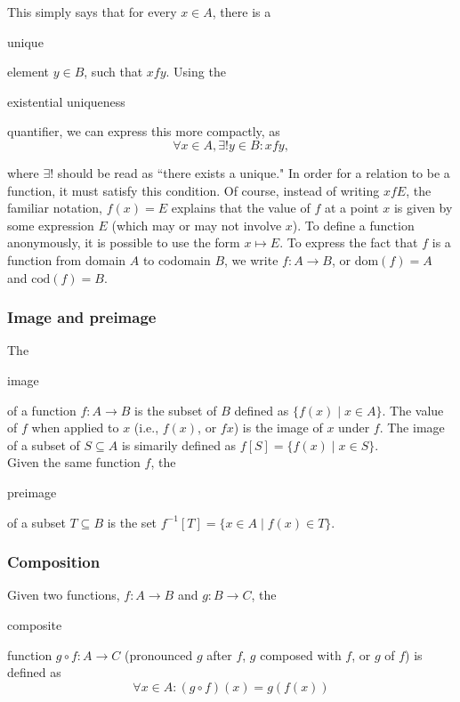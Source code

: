 \documentclass[11pt]{article}
\theoremstyle{plain}
\theoremstyle{definition}
\begin{document}
\noindent This simply says that for every $ x \in A $, there is a \begin{em}unique\end{em} element $ y \in B $, such that $ x f y $. Using the \begin{em}existential uniqueness\end{em} quantifier, we can express this more compactly, as
$$
  \forall x \in A, \exists ! y \in B : x f y,
$$

\noindent where $ \exists ! $ should be read as ``there exists a unique."
In order for a relation to be a function, it must satisfy this condition.
Of course, instead of writing $ x f E $, the familiar notation, $ f(x) = E $ explains that the value of $ f $ at a point $ x $ is given by some expression $ E $ (which may or may not involve $ x $).
To define a function anonymously, it is possible to use the form $ x \mapsto E $.
To express the fact that $ f $ is a function from domain $ A $ to codomain $ B $, we write $ f : A \to B $, or $ \mathrm{dom}(f) = A $ and $ \mathrm{cod}(f) = B $.

\subsubsection*{Image and preimage}

The \begin{em}image\end{em} of a function $ f : A \to B $ is the subset of $ B $ defined as $ \{ f(x) \mid x \in A \} $.
The value of $ f $ when applied to $ x $ (i.e., $ f (x) $, or $ f x $) is the image of $ x $ under $ f $.
The image of a subset of $ S \subseteq A $ is simarily defined as $ f[S] = \{ f(x) \mid x \in S \} $. \\

\noindent Given the same function $ f $, the \begin{em}preimage\end{em} of a subset $ T \subseteq B $ is the set $ f^{-1}[T] = \{ x \in A \mid f(x) \in T \} $.

\begin{center}
  \def\svgwidth{0.85\columnwidth}
  
\end{center}

\subsubsection*{Composition}

\noindent Given two functions, $ f : A \to B $ and $ g : B \to C $, the \begin{em}composite\end{em} function $ g \circ f : A \to C $ (pronounced $ g $ after $ f $, $ g $ composed with $ f $, or $ g $ of $ f $) is defined as
$$
  \forall x \in A : (g \circ f) (x) = g (f(x))
$$
\end{document}

